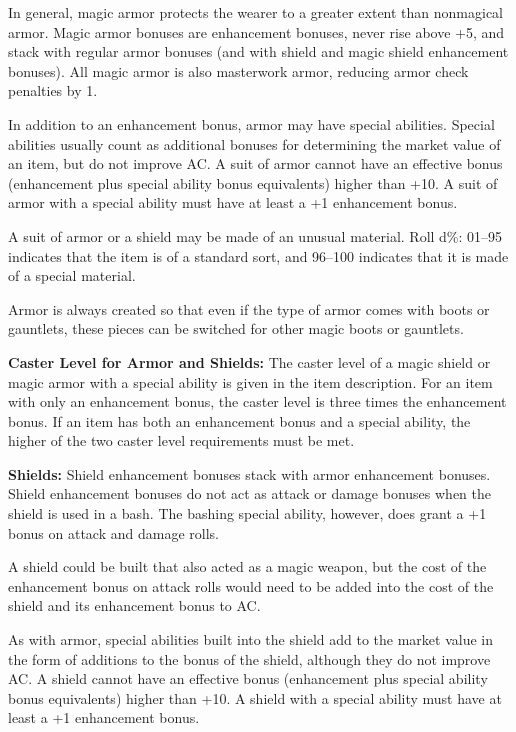 In general, magic armor protects the wearer to a greater extent than nonmagical armor. Magic armor bonuses are enhancement bonuses, never rise above +5, and stack with regular armor bonuses (and with shield and magic shield enhancement bonuses). All magic armor is also masterwork armor, reducing armor check penalties by 1.

In addition to an enhancement bonus, armor may have special abilities. Special abilities usually count as additional bonuses for determining the market value of an item, but do not improve AC. A suit of armor cannot have an effective bonus (enhancement plus special ability bonus equivalents) higher than +10. A suit of armor with a special ability must have at least a +1 enhancement bonus.

A suit of armor or a shield may be made of an unusual material. Roll d\%: 01--95 indicates that the item is of a standard sort, and 96--100 indicates that it is made of a special material.

Armor is always created so that even if the type of armor comes with boots or gauntlets, these pieces can be switched for other magic boots or gauntlets.

\textbf{Caster Level for Armor and Shields:} The caster level of a magic shield or magic armor with a special ability is given in the item description. For an item with only an enhancement bonus, the caster level is three times the enhancement bonus. If an item has both an enhancement bonus and a special ability, the higher of the two caster level requirements must be met.

\textbf{Shields:} Shield enhancement bonuses stack with armor enhancement bonuses. Shield enhancement bonuses do not act as attack or damage bonuses when the shield is used in a bash. The bashing special ability, however, does grant a +1 bonus on attack and damage rolls.

A shield could be built that also acted as a magic weapon, but the cost of the enhancement bonus on attack rolls would need to be added into the cost of the shield and its enhancement bonus to AC.

As with armor, special abilities built into the shield add to the market value in the form of additions to the bonus of the shield, although they do not improve AC. A shield cannot have an effective bonus (enhancement plus special ability bonus equivalents) higher than +10. A shield with a special ability must have at least a +1 enhancement bonus.

